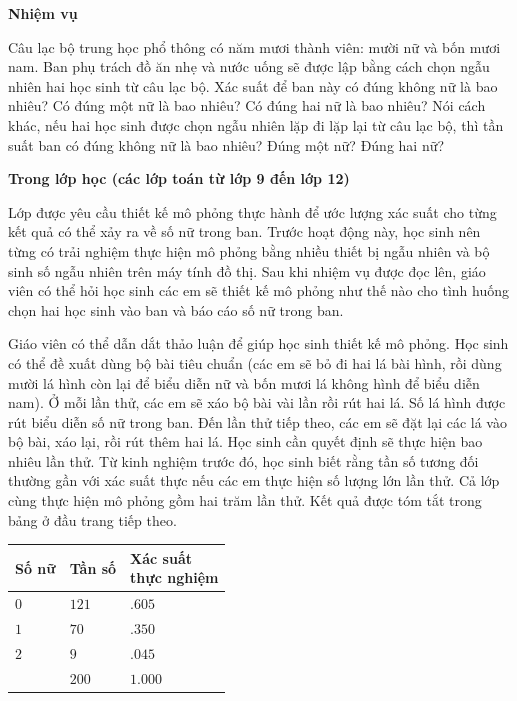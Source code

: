   {
    \textbf{Nhiệm vụ}

    Câu lạc bộ trung học phổ thông có năm mươi thành viên: mười nữ và bốn mươi nam. Ban phụ trách đồ ăn nhẹ và nước uống sẽ được lập bằng cách chọn ngẫu nhiên hai học sinh từ câu lạc bộ. Xác suất để ban này có đúng không nữ là bao nhiêu? Có đúng một nữ là bao nhiêu? Có đúng hai nữ là bao nhiêu? Nói cách khác, nếu hai học sinh được chọn ngẫu nhiên lặp đi lặp lại từ câu lạc bộ, thì tần suất ban có đúng không nữ là bao nhiêu? Đúng một nữ? Đúng hai nữ?

    \textbf{Trong lớp học (các lớp toán từ lớp 9 đến lớp 12)}

    Lớp được yêu cầu thiết kế mô phỏng thực hành để ước lượng xác suất cho từng kết quả có thể xảy ra về số nữ trong ban. Trước hoạt động này, học sinh nên từng có trải nghiệm thực hiện mô phỏng bằng nhiều thiết bị ngẫu nhiên và bộ sinh số ngẫu nhiên trên máy tính đồ thị. Sau khi nhiệm vụ được đọc lên, giáo viên có thể hỏi học sinh các em sẽ thiết kế mô phỏng như thế nào cho tình huống chọn hai học sinh vào ban và báo cáo số nữ trong ban.\vspace{3\baselineskip}

    Giáo viên có thể dẫn dắt thảo luận để giúp học sinh thiết kế mô phỏng. Học sinh có thể đề xuất dùng bộ bài tiêu chuẩn (các em sẽ bỏ đi hai lá bài hình, rồi dùng mười lá hình còn lại để biểu diễn nữ và bốn mươi lá không hình để biểu diễn nam). Ở mỗi lần thử, các em sẽ xáo bộ bài vài lần rồi rút hai lá. Số lá hình được rút biểu diễn số nữ trong ban. Đến lần thử tiếp theo, các em sẽ đặt lại các lá vào bộ bài, xáo lại, rồi rút thêm hai lá. Học sinh cần quyết định sẽ thực hiện bao nhiêu lần thử. Từ kinh nghiệm trước đó, học sinh biết rằng tần số tương đối thường gần với xác suất thực nếu các em thực hiện số lượng lớn lần thử. Cả lớp cùng thực hiện mô phỏng gồm hai trăm lần thử. Kết quả được tóm tắt trong bảng ở đầu trang tiếp theo.\vspace*{2\baselineskip} 

    \begin{center}
    \begin{tabular}{|
    >{\centering\arraybackslash}m{1.8cm}|
    >{\centering\arraybackslash}m{1.8cm}|
    >{\centering\arraybackslash}m{3.0cm}|}
    \hline
    Số nữ & Tần số & \shortstack{Xác suất\\thực nghiệm} \\
    \hline
    $0$ & $121$ & $.605$ \\
    \hline
    $1$ & $70$  & $.350$ \\
    \hline
    $2$ & $9$   & $.045$ \\
    \hline
        & $200$ & $1.000$ \\
    \hline
    \end{tabular}
    \end{center}

}
